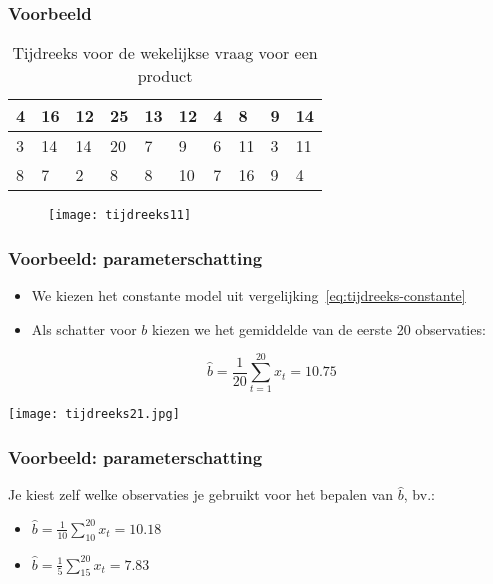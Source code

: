\documentclass[aspectratio=169]{beamer}
\begin{document}
\begin{frame}
  \frametitle{Voorbeeld}
  
  \begin{table}[t]
    \centering
    \begin{tabular}{|l|l|l|l|l|l|l|l|l|l|}
      \hline
      4 & 16 & 12 & 25 & 13 & 12 & 4 & 8  & 9 & 14 \\ \hline
      3 & 14 & 14 & 20 & 7  & 9  & 6 & 11 & 3 & 11 \\ \hline
      8 & 7  & 2  & 8  & 8  & 10 & 7 & 16 & 9 & 4  \\ \hline
    \end{tabular}
    \label{tab:data}
    \caption{Tijdreeks voor de wekelijkse vraag voor een product}
  \end{table}
  
  \begin{figure}
    \centering
    \texttt{[image: tijdreeks11]}
  \end{figure}
\end{frame}

\begin{frame}
  \frametitle{Voorbeeld: parameterschatting}
  
  \begin{itemize}
    \item We kiezen het constante model uit vergelijking~\ref{eq:tijdreeks-constante}
    \item Als schatter voor $b$ kiezen we het gemiddelde van de eerste 20 observaties:
    
    \[ \widehat{b} = \frac{1}{20} \sum_{t = 1}^{20} x_{t}= 10.75 \]
    
  \end{itemize}
  
  \centering
  \texttt{[image: tijdreeks21.jpg]}
\end{frame}

\begin{frame}
  \frametitle{Voorbeeld: parameterschatting}
  
  Je kiest zelf welke observaties je gebruikt voor het bepalen van $\widehat{b}$, bv.:
  
  \begin{itemize}
    \item $\widehat{b} = \frac{1}{10} \sum_{10}^{20} x_{t} = 10.18$
    \item $\widehat{b} = \frac{1}{5} \sum_{15}^{20} x_{t} = 7.83$
  \end{itemize}
  
\end{frame}
\end{document}
